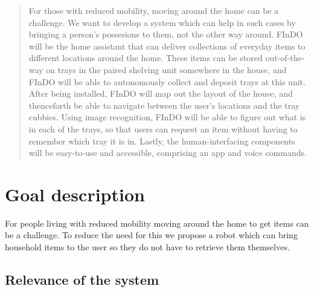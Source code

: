 \documentclass{article}
\begin{document}
 



\begin{abstract} 

For those with reduced mobility, moving around the home can be a challenge. 
We want to develop a system which can help in such cases by bringing a person's possesions to them, not the other way around. 
FInDO will be the home assistant that can deliver collections of everyday items to different locations around the home. 
These items can be stored out-of-the-way on trays in the paired shelving unit somewhere in the house, and FInDO will be able to autonomously collect and deposit trays at this unit. 
After being installed, FInDO will map out the layout of the house, and thenceforth be able to navigate between the user's locations and the tray cubbies. 
Using image recognition, FInDO will be able to figure out what is in each of the trays, so that users can request an item without having to remember which tray it is in. 
Lastly, the human-interfacing components will be easy-to-use and accessible, comprising an app and voice commands.

\end{abstract} 

\section{Goal description} 

For people living with reduced mobility moving around the home to get items can be a challenge. To reduce the need for this we propose a robot which can bring household items to the user so they do not have to retrieve them themselves.
\subsection{Relevance of the system} 
\end{document}

